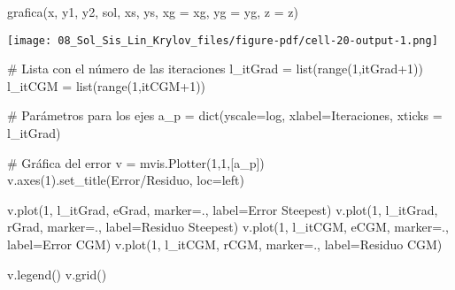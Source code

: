 \documentclass[
  letterpaper,
  DIV=11,
  numbers=noendperiod]{scrreprt}
\newenvironment{Shaded}{\begin{snugshade}}{\end{snugshade}}
\newcommand{\BuiltInTok}[1]{\textcolor[rgb]{0.00,0.23,0.31}{#1}}
\newcommand{\CommentTok}[1]{\textcolor[rgb]{0.37,0.37,0.37}{#1}}
\newcommand{\DecValTok}[1]{\textcolor[rgb]{0.68,0.00,0.00}{#1}}
\newcommand{\NormalTok}[1]{\textcolor[rgb]{0.00,0.23,0.31}{#1}}
\newcommand{\OperatorTok}[1]{\textcolor[rgb]{0.37,0.37,0.37}{#1}}
\newcommand{\StringTok}[1]{\textcolor[rgb]{0.13,0.47,0.30}{#1}}
\begin{document}
\begin{Shaded}
\begin{Highlighting}[]
\NormalTok{grafica(x, y1, y2, sol, xs, ys, xg }\OperatorTok{=}\NormalTok{ xg, yg }\OperatorTok{=}\NormalTok{ yg, z }\OperatorTok{=}\NormalTok{ z)}
\end{Highlighting}
\end{Shaded}

\texttt{[image: 08\_Sol\_Sis\_Lin\_Krylov\_files/figure-pdf/cell-20-output-1.png]}

\begin{Shaded}
\begin{Highlighting}[]
\CommentTok{\# Lista con el número de las iteraciones}
\NormalTok{l\_itGrad }\OperatorTok{=} \BuiltInTok{list}\NormalTok{(}\BuiltInTok{range}\NormalTok{(}\DecValTok{1}\NormalTok{,itGrad}\OperatorTok{+}\DecValTok{1}\NormalTok{)) }
\NormalTok{l\_itCGM }\OperatorTok{=} \BuiltInTok{list}\NormalTok{(}\BuiltInTok{range}\NormalTok{(}\DecValTok{1}\NormalTok{,itCGM}\OperatorTok{+}\DecValTok{1}\NormalTok{))}

\CommentTok{\# Parámetros para los ejes}
\NormalTok{a\_p }\OperatorTok{=} \BuiltInTok{dict}\NormalTok{(yscale}\OperatorTok{=}\StringTok{\textquotesingle{}log\textquotesingle{}}\NormalTok{, xlabel}\OperatorTok{=}\StringTok{\textquotesingle{}Iteraciones\textquotesingle{}}\NormalTok{, xticks }\OperatorTok{=}\NormalTok{ l\_itGrad)}

\CommentTok{\# Gráfica del error}
\NormalTok{v }\OperatorTok{=}\NormalTok{ mvis.Plotter(}\DecValTok{1}\NormalTok{,}\DecValTok{1}\NormalTok{,[a\_p]) }
\NormalTok{v.axes(}\DecValTok{1}\NormalTok{).set\_title(}\StringTok{\textquotesingle{}Error/Residuo\textquotesingle{}}\NormalTok{, loc}\OperatorTok{=}\StringTok{\textquotesingle{}left\textquotesingle{}}\NormalTok{)}

\NormalTok{v.plot(}\DecValTok{1}\NormalTok{, l\_itGrad, eGrad, marker}\OperatorTok{=}\StringTok{\textquotesingle{}.\textquotesingle{}}\NormalTok{, label}\OperatorTok{=}\StringTok{\textquotesingle{}Error Steepest\textquotesingle{}}\NormalTok{)}
\NormalTok{v.plot(}\DecValTok{1}\NormalTok{, l\_itGrad, rGrad, marker}\OperatorTok{=}\StringTok{\textquotesingle{}.\textquotesingle{}}\NormalTok{, label}\OperatorTok{=}\StringTok{\textquotesingle{}Residuo Steepest\textquotesingle{}}\NormalTok{)}
\NormalTok{v.plot(}\DecValTok{1}\NormalTok{, l\_itCGM, eCGM, marker}\OperatorTok{=}\StringTok{\textquotesingle{}.\textquotesingle{}}\NormalTok{, label}\OperatorTok{=}\StringTok{\textquotesingle{}Error CGM\textquotesingle{}}\NormalTok{)}
\NormalTok{v.plot(}\DecValTok{1}\NormalTok{, l\_itCGM, rCGM, marker}\OperatorTok{=}\StringTok{\textquotesingle{}.\textquotesingle{}}\NormalTok{, label}\OperatorTok{=}\StringTok{\textquotesingle{}Residuo CGM\textquotesingle{}}\NormalTok{)}

\NormalTok{v.legend()}
\NormalTok{v.grid()}
\end{Highlighting}
\end{Shaded}
\end{document}
